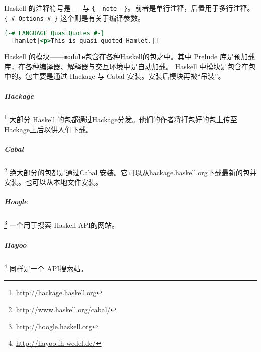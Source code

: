Haskell 的注释符号是 \verb"--" 与 \verb"{- note -}"。前者是单行注释，后置用于多行注释。\verb"{-# Options #-}" 这个则是有关于编译参数。
\begin{lstlisting}[language=Haskell,caption={引号替代}]
  {-# LANGUAGE QuasiQuotes #-}
  [hamlet|<p>This is quasi-quoted Hamlet.|]
\end{lstlisting}
Haskell 的模块——\verb"module"包含在各种Haskell的包之中。其中 Prelude 库是预加载库，在各种编译器、解释器与交互环境中是自动加载。 Haskell 中模块是包含在包中的。包主要是通过 Hackage 与 Cabal 安装。安装后模块再被“吊装”。

\subparagraph{Hackage} \footnote{\url{http://hackage.haskell.org}}
大部分 Haskell 的包都通过Hackage分发。他们的作者将打包好的包上传至Hackage上后以供人们下载。

\subparagraph{Cabal}\footnote{ \url{ http://www.haskell.org/cabal/}}
绝大部分的包都是通过Cabal 安装。它可以从hackage.haskell.org下载最新的包并安装。也可以从本地文件安装。

\subparagraph{Hoogle}\footnote{\url{http://hoogle.haskell.org}} 一个用于搜索 Haskell API的网站。
\subparagraph{Hayoo}\footnote{\url{http://hayoo.fh-wedel.de/}} 同样是一个 API搜索站。






\documentEnd
\endinput 